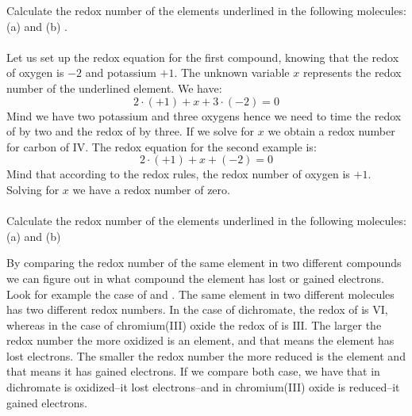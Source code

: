 \documentclass[main.tex]{subfiles} %
\begin{document}
\begin{description}
\begin{description}
\begin{example}
Calculate the redox number of the elements underlined in the following molecules: (a)  and (b) .
\\
\\
Let us set up the redox equation for the first compound, knowing that the redox of oxygen is $-2$ and potassium $+1$. The unknown variable $x$ represents the redox number of the underlined element. We have:
\[2\cdot (+1)+x+3\cdot (-2)=0\]
Mind we have two potassium and three oxygens hence we need to time the redox of  by two and the redox of  by three. If we solve for $x$ we obtain a redox number for carbon of $\text{IV}$. The redox equation for the second example is:
\[2\cdot (+1) + x+ (-2)=0\]
Mind that according to the redox rules, the redox number of oxygen is $+1$. Solving for $x$ we have a redox number of zero.
\\
\faDiamond\ \\
Calculate the redox number of the elements underlined in the following molecules: (a)  and (b)  
  \\
\end{example}%
\end{description}



\item[\docfilehook{Redox means oxidation and reduction}{}] By comparing the redox number of the same element in two different compounds we can figure out in what compound the element has lost or gained electrons. Look for example the case of  and  . The same element in two different molecules has two different redox numbers. In the case of dichromate, the redox of  is  $\text{VI}$, whereas in the case of chromium(III) oxide the redox of  is $\text{III}$. The larger the redox number the more oxidized is an element, and that means the element has lost electrons. The smaller the redox number the more reduced is the element and that means it has gained electrons. If we compare both case, we have that  in dichromate is oxidized--it lost electrons--and  in chromium(III) oxide is reduced--it gained electrons.


\end{description}
\end{document}
